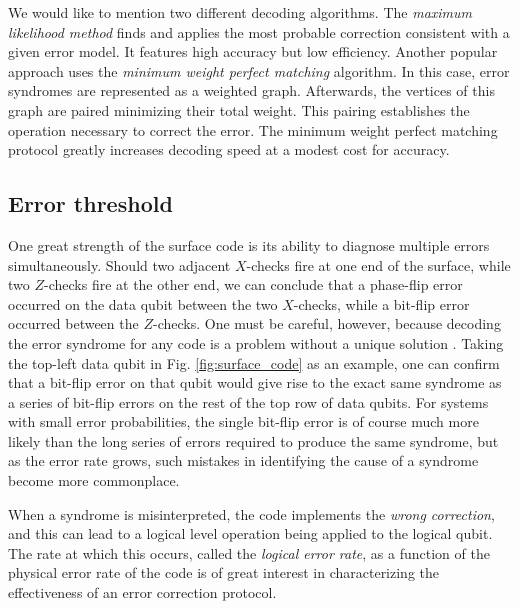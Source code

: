 We would like to mention two different decoding algorithms. The \textit{maximum
  likelihood method} \cite{Varsamopoulos_2020} finds and applies the most
probable correction consistent with a given error model. It features high
accuracy but low efficiency. Another popular approach uses the \textit{minimum
  weight perfect matching} \cite{fowler2013minimum} algorithm. In this case,
error syndromes are represented as a weighted graph. Afterwards, the vertices of
this graph are paired minimizing their total weight. This pairing establishes
the operation necessary to correct the error. The minimum weight perfect
matching protocol greatly increases decoding speed at a modest cost for
accuracy.

\subsection{Error threshold}
One great strength of the surface code is its ability to diagnose multiple
errors simultaneously. Should two adjacent $X$-checks fire at one end of the
surface, while two $Z$-checks fire at the other end, we can conclude that a
phase-flip error occurred on the data qubit between the two $X$-checks, while a
bit-flip error occurred between the $Z$-checks. One must be careful, however,
because decoding the error syndrome for any code is a problem without a unique
solution \cite{terhal15}. Taking the top-left data qubit in Fig.
\ref{fig:surface_code} as an example, one can confirm that a bit-flip error on
that qubit would give rise to the exact same syndrome as a series of bit-flip
errors on the rest of the top row of data qubits. For systems with small error
probabilities, the single bit-flip error is of course much more likely than the
long series of errors required to produce the same syndrome, but as the error
rate grows, such mistakes in identifying the cause of a syndrome become more
commonplace.

When a syndrome is misinterpreted, the code implements the \textit{wrong
  correction}, and this can lead to a logical level operation being applied to
the logical qubit. The rate at which this occurs, called the \textit{logical
  error rate}, as a function of the physical error rate of the code is of great
interest in characterizing the effectiveness of an error correction protocol.

